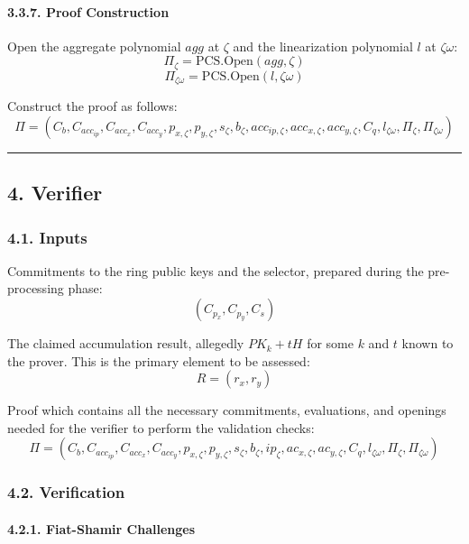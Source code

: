 \documentclass[
]{article}
\begin{document}
\hypertarget{proof-construction}{%
\paragraph{3.3.7. Proof Construction}\label{proof-construction}}

Open the aggregate polynomial \(agg\) at \(\zeta\) and the linearization
polynomial \(l\) at \(\zeta\omega\):
\[\Pi_\zeta = \text{PCS.Open}(agg,\zeta)\]
\[\Pi_{\zeta\omega} = \text{PCS.Open}(l,\zeta\omega)\]

Construct the proof as follows:
\[\Pi=(C_b,C_{acc_{ip}},C_{acc_x},C_{acc_y},p_{x,\zeta},p_{y,\zeta},s_\zeta,b_\zeta,acc_{ip,\zeta},acc_{x,\zeta},acc_{y,\zeta},C_q,l_{\zeta\omega},\Pi_\zeta,\Pi_{\zeta\omega})\]

\begin{center}\rule{0.5\linewidth}{0.5pt}\end{center}

\hypertarget{verifier}{%
\subsection{4. Verifier}\label{verifier}}

\hypertarget{inputs}{%
\subsubsection{4.1. Inputs}\label{inputs}}

Commitments to the ring public keys and the selector, prepared during
the pre-processing phase: \[(C_{p_x}, C_{p_y}, C_s)\]

The claimed accumulation result, allegedly \(PK_k + tH\) for some \(k\)
and \(t\) known to the prover. This is the primary element to be
assessed: \[R = (r_x, r_y)\]

Proof which contains all the necessary commitments, evaluations, and
openings needed for the verifier to perform the validation checks: \[
\Pi = (C_b, C_{acc_{ip}}, C_{acc_x}, C_{acc_y}, p_{x,\zeta}, p_{y,\zeta}, s_\zeta, b_\zeta, ip_{\zeta}, ac_{x,\zeta}, ac_{y,\zeta}, C_q, l_{\zeta\omega}, \Pi_\zeta, \Pi_{\zeta\omega})
\]

\hypertarget{verification}{%
\subsubsection{4.2. Verification}\label{verification}}

\hypertarget{fiat-shamir-challenges}{%
\paragraph{4.2.1. Fiat-Shamir Challenges}\label{fiat-shamir-challenges}}
\end{document}
